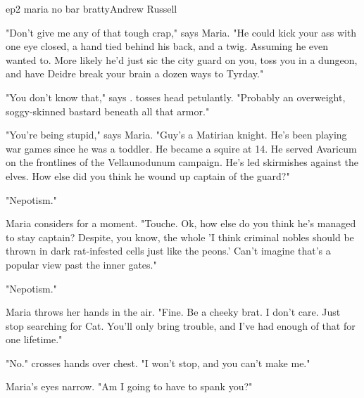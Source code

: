 \documentclass{book}
\begin{document}
\begin{childnode}{ep2 maria no bar bratty}{Andrew Russell}


    "Don't give me any of that tough  crap," says Maria. "He could kick your ass with one eye closed, a hand tied behind his back, and a twig. Assuming he even wanted to. More likely he'd just sic the city guard on you, toss you in a dungeon, 
    and have Deidre break your brain a dozen ways to Tyrday."

    "You don't know that," says \name{}. \HeShe{} tosses \hisher{} head petulantly. "Probably an overweight, soggy-skinned bastard beneath all that armor."

    "You're being stupid," says Maria. "Guy's a Matirian knight. He's been playing war games since he was a toddler. He became a squire at 14. He served Avaricum on the frontlines of the Vellaunodunum campaign. He's led skirmishes against the elves. 
    How else did you think he wound up captain of the guard?"
    
    "Nepotism."

    Maria considers for a moment. "Touche. Ok, how else do you think he's managed to stay captain? Despite, you know, the whole 'I think criminal nobles should be thrown in dark rat-infested cells just like the peons.' Can't imagine that's a popular
    view past the inner gates."

    "Nepotism."

    Maria throws her hands in the air. "Fine. Be a cheeky brat. I don't care. Just stop searching for Cat. You'll only bring trouble, and I've had enough of that for one lifetime."

    "No." \name{} crosses \hisher{} hands over \hisher{} chest. "I won't stop, and you can't make me."
   
    Maria's eyes narrow. "Am I going to have to spank you?"




\end{childnode}
\end{document}

